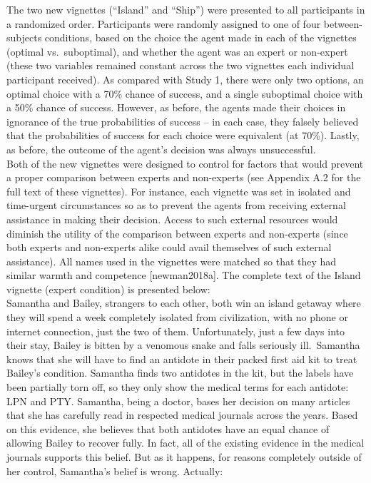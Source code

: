 \documentclass[
  man,floatsintext]{apa6}
\begin{document}
The two new vignettes (``Island'' and ``Ship'') were presented to all participants in a randomized order. Participants were randomly assigned to one of four between-subjects conditions, based on the choice the agent made in each of the vignettes (optimal vs.~suboptimal), and whether the agent was an expert or non-expert (these two variables remained constant across the two vignettes each individual participant received). As compared with Study 1, there were only two options, an optimal choice with a 70\% chance of success, and a single suboptimal choice with a 50\% chance of success. However, as before, the agents made their choices in ignorance of the true probabilities of success -- in each case, they falsely believed that the probabilities of success for each choice were equivalent (at 70\%). Lastly, as before, the outcome of the agent's decision was always unsuccessful.\\
Both of the new vignettes were designed to control for factors that would prevent a proper comparison between experts and non-experts (see Appendix A.2 for the full text of these vignettes). For instance, each vignette was set in isolated and time-urgent circumstances so as to prevent the agents from receiving external assistance in making their decision. Access to such external resources would diminish the utility of the comparison between experts and non-experts (since both experts and non-experts alike could avail themselves of such external assistance). All names used in the vignettes were matched so that they had similar warmth and competence {[}newman2018a{]}. The complete text of the Island vignette (expert condition) is presented below:\\
Samantha and Bailey, strangers to each other, both win an island getaway where they will spend a week completely isolated from civilization, with no phone or internet connection, just the two of them. Unfortunately, just a few days into their stay, Bailey is bitten by a venomous snake and falls seriously ill.~Samantha knows that she will have to find an antidote in their packed first aid kit to treat Bailey's condition. Samantha finds two antidotes in the kit, but the labels have been partially torn off, so they only show the medical terms for each antidote: LPN and PTY. Samantha, being a doctor, bases her decision on many articles that she has carefully read in respected medical journals across the years. Based on this evidence, she believes that both antidotes have an equal chance of allowing Bailey to recover fully. In fact, all of the existing evidence in the medical journals supports this belief. But as it happens, for reasons completely outside of her control, Samantha's belief is wrong. Actually:\\
\end{document}
